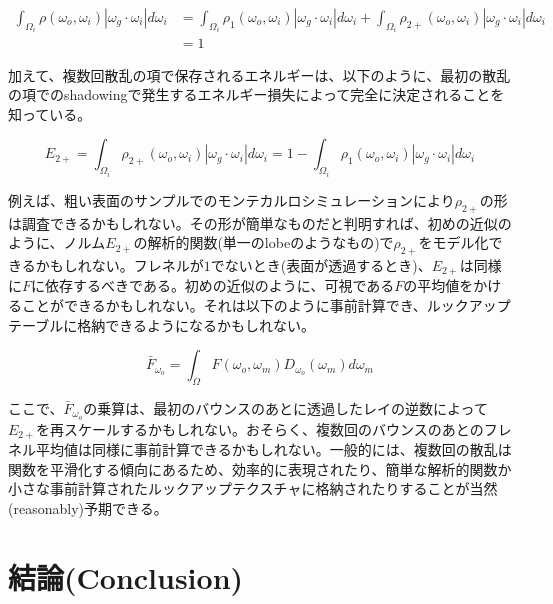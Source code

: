 \documentclass[a4j,xelatex,ja=standard]{bxjsarticle}
\begin{document}
\begin{equation}
    \begin{split}
        \int_{\Omega_i} \rho(\omega_o, \omega_i) |\omega_g \cdot \omega_i| d\omega_i & = \int_{\Omega_i} \rho_1(\omega_o, \omega_i) |\omega_g \cdot \omega_i| d\omega_i + \int_{\Omega_i} \rho_{2+}(\omega_o, \omega_i) |\omega_g \cdot \omega_i| d\omega_i \\
        & = 1
    \end{split}
    \label{eq:103}
\end{equation}

加えて、複数回散乱の項で保存されるエネルギーは、以下のように、最初の散乱の項でのshadowingで発生するエネルギー損失によって完全に決定されることを知っている。

\begin{equation}
    E_{2+} = \int_{\Omega_i} \rho_{2+}(\omega_o, \omega_i) |\omega_g \cdot \omega_i| d\omega_i = 1 - \int_{\Omega_i} \rho_1(\omega_o, \omega_i) |\omega_g \cdot \omega_i| d\omega_i
    \label{eq:104}
\end{equation}

例えば、粗い表面のサンプルでのモンテカルロシミュレーションにより$\rho_{2+}$の形は調査できるかもしれない。その形が簡単なものだと判明すれば、初めの近似のように、ノルム$E_{2+}$の解析的関数(単一のlobeのようなもの)で$\rho_{2+}$をモデル化できるかもしれない。フレネルが$1$でないとき(表面が透過するとき)、$E_{2+}$は同様に$F$に依存するべきである。初めの近似のように、可視である$F$の平均値をかけることができるかもしれない。それは以下のように事前計算でき、ルックアップテーブルに格納できるようになるかもしれない。

\begin{equation}
    \bar{F}_{\omega_o} = \int_{\Omega} F(\omega_o, \omega_m) D_{\omega_o}(\omega_m) d\omega_m
    \label{eq:105}
\end{equation}

ここで、$\bar{F}_{\omega_o}$の乗算は、最初のバウンスのあとに透過したレイの逆数によって$E_{2+}$を再スケールするかもしれない。おそらく、複数回のバウンスのあとのフレネル平均値は同様に事前計算できるかもしれない。一般的には、複数回の散乱は関数を平滑化する傾向にあるため、効率的に表現されたり、簡単な解析的関数か小さな事前計算されたルックアップテクスチャに格納されたりすることが当然(reasonably)予期できる。

\section{結論(Conclusion)}
\end{document}
